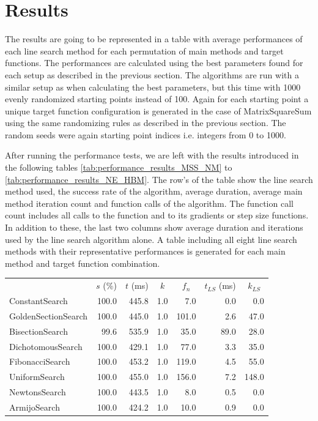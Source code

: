 \documentclass[a4paper,english,titlepage,12pt]{article}
\begin{document}
\section{Results}

The results are going to be represented in a table with average performances of each line search method for each permutation of main methods and target functions. The performances are calculated using the best parameters found for each setup as described in the previous section. The algorithms are run with a similar setup as when calculating the best parameters, but this time with 1000 evenly randomized starting points instead of 100. Again for each starting point a unique target function configuration is generated in the case of MatrixSquareSum using the same randomizing rules as described in the previous section. The random seeds were again starting point indices i.e. integers from 0 to 1000.

After running the performance tests, we are left with the results introduced in the following tables \ref{tab:performance_results_MSS_NM} to \ref{tab:performance_results_NE_HBM}. The row's of the table show the line search method used, the success rate of the algorithm, average duration, average main method iteration count and function calls of the algorithm. The function call count includes all calls to the function and to its gradients or step size functions. In addition to these, the last two columns show average duration and iterations used by the line search algorithm alone. A table including all eight line search methods with their representative performances is generated for each main method and target function combination.


\begin{center}
\label{tab:performance_results_MSS_NM}
\begin{tabular}{|l|r|r|r|r|r|r|}
\hline
\rowcolor{gray!25}
\multicolumn{1}{|c|}{Line Search Name} & \multicolumn{1}{c|}{$s$ (\%)} & \multicolumn{1}{c|}{$t$ (ms)} & \multicolumn{1}{c|}{$k$} & \multicolumn{1}{c|}{$f_n$} & \multicolumn{1}{c|}{$t_{LS}$ (ms)} & \multicolumn{1}{c|}{$k_{LS}$} \\
ConstantSearch & 100.0 & 445.8 & 1.0 & 7.0 & 0.0 & 0.0 \\
GoldenSectionSearch & 100.0 & 445.0 & 1.0 & 101.0 & 2.6 & 47.0 \\
BisectionSearch & 99.6 & 535.9 & 1.0 & 35.0 & 89.0 & 28.0 \\
DichotomousSearch & 100.0 & 429.1 & 1.0 & 77.0 & 3.3 & 35.0 \\
FibonacciSearch & 100.0 & 453.2 & 1.0 & 119.0 & 4.5 & 55.0 \\
UniformSearch & 100.0 & 455.0 & 1.0 & 156.0 & 7.2 & 148.0 \\
NewtonsSearch & 100.0 & 443.5 & 1.0 & 8.0 & 0.5 & 0.0 \\
ArmijoSearch & 100.0 & 424.2 & 1.0 & 10.0 & 0.9 & 0.0 \\
\hline
\end{tabular}
\end{center}
\end{document}
